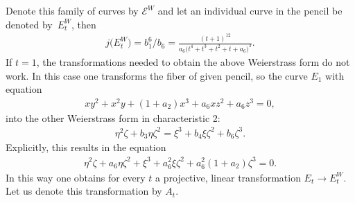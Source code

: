 \documentclass[pdftex]{sigma}
\numberwithin{equation}{section}
\begin{document}
Denote this family of curves by $\mathcal{E}^W$ and let an individual curve in the pencil be denoted by~$E_t^W$, then
\begin{gather*}
j\big(E^W_t\big)=b_1^6/b_6 = \frac{(t+1)^{12}}{a_6\big(t^4+t^3+t^2+t+a_6\big)^3}.
\end{gather*}
If $t=1$, the transformations needed to obtain the above Weierstrass form do not work. In this case one transforms the fiber of given pencil, so the curve $E_1$ with equation
\begin{gather*}xy^2+x^2y+(1+a_2)x^3+a_6xz^2+a_6z^3=0,\end{gather*}
into the other Weierstrass form in characteristic 2:
\begin{gather*}\eta^2\zeta + b_3 \eta \zeta^2 = \xi^3 + b_4 \xi \zeta^2 + b_6 \zeta^3.\end{gather*}
Explicitly, this results in the equation
\begin{gather*}
 \eta^2 \zeta + a_6 \eta \zeta^2 + \xi^3 + a_6^2 \xi \zeta^2 + a_6^2(1+a_2) \zeta^3 =0.
\end{gather*}
In this way one obtains for every $t$ a projective, linear transformation $E_t \rightarrow E_t^W$. Let us denote this transformation by $A_t$.
\end{document}
